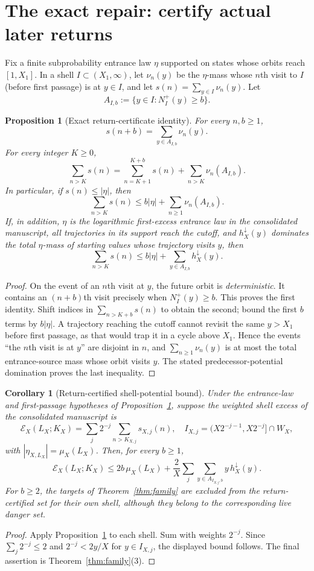 \documentclass[11pt,a4paper]{article}
\newtheorem{proposition}[theorem]{Proposition}
\newtheorem{corollary}[theorem]{Corollary}
\newcommand{\calE}{\mathcal E}
\begin{document}
\section{The exact repair: certify actual later returns}
Fix a finite subprobability entrance law $\eta$ supported on states
whose orbits reach $[1,X_1]$. In a shell $I\subset (X_1,\infty)$,
let $\nu_n(y)$ be the $\eta$-mass whose $n$th visit to $I$ (before
first passage) is at $y\in I$, and let $s(n)=\sum_{y\in I}\nu_n(y)$.
Let
\[
 A_{I,b}:=\{y\in I:N_I^+(y)\ge b\}.
\]
\begin{proposition}[Exact return-certificate identity]\label{prop:certificate}
For every $n,b\ge1$,
\[
 \boxed{s(n+b)=\sum_{y\in A_{I,b}}\nu_n(y).}
\]
For every integer $K\ge0$,
\[
 \sum_{n>K}s(n)
 =\sum_{n=K+1}^{K+b}s(n)
 +\sum_{n>K}\nu_n(A_{I,b}).
\]
In particular, if $s(n)\le|\eta|$, then
\[
 \sum_{n>K}s(n)\le b|\eta|+\sum_{n\ge1}\nu_n(A_{I,b}).
\]
If, in addition, $\eta$ is the logarithmic first-excess entrance
law in the consolidated manuscript, all trajectories in its support
reach the cutoff, and $h^\downarrow_X(y)$ dominates the total
$\eta$-mass of starting values whose trajectory visits $y$, then
\[
 \sum_{n>K}s(n)\le b|\eta|+\sum_{y\in A_{I,b}}h_X^\downarrow(y).
\]
\end{proposition}
\begin{proof}
On the event of an $n$th visit at $y$, the future orbit is
\emph{deterministic}. It contains an $(n+b)$th visit precisely when
$N_I^+(y)\ge b$. This proves the first identity. Shift indices in
$\sum_{n>K+b}s(n)$ to obtain the second; bound the first $b$
terms by $b|\eta|$. A trajectory reaching the cutoff cannot revisit
the same $y>X_1$ before first passage, as that would trap it in a
cycle above $X_1$. Hence the events ``the $n$th visit is at $y$''
are disjoint in $n$, and
$\sum_{n\ge1}\nu_n(y)$ is at most the total entrance-source mass
whose orbit visits $y$. The stated predecessor-potential domination
proves the last inequality.
\end{proof}

\begin{corollary}[Return-certified shell-potential bound]
Under the entrance-law and first-passage hypotheses of
Proposition~\ref{prop:certificate}, suppose the weighted shell
excess of the consolidated manuscript is
\[
 \calE_X(L_X;K_X)=\sum_j2^{-j}\sum_{n>K_{X,j}}s_{X,j}(n),
 \quad I_{X,j}=(X2^{-j-1},X2^{-j}]\cap W_X,
\]
with $|\eta_{X,L_X}|=\mu_X(L_X)$. Then, for every $b\ge1$,
\[
 \boxed{\quad
 \calE_X(L_X;K_X)\le2b\,\mu_X(L_X)
 +\frac2X\sum_j\sum_{y\in A_{I_{X,j},b}}
 y\,h_X^\downarrow(y).\quad}
\]
For $b\ge2$, the targets of Theorem~\ref{thm:family} are excluded
from the return-certified set for their own shell, although they
belong to the corresponding live danger set.
\end{corollary}
\begin{proof}
Apply Proposition~\ref{prop:certificate} to each shell. Sum
with weights $2^{-j}$. Since $\sum_j2^{-j}\le2$ and
$2^{-j}<2y/X$ for $y\in I_{X,j}$, the displayed bound follows.
The final assertion is Theorem~\ref{thm:family}(3).
\end{proof}
\end{document}
